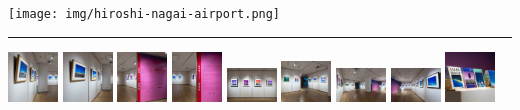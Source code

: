 \documentclass[
  letterpaper,
  DIV=11,
  numbers=noendperiod,
  oneside]{scrartcl}
\begin{document}
\texttt{[image: img/hiroshi-nagai-airport.png]}

\begin{center}\rule{0.5\linewidth}{0.5pt}\end{center}

\includegraphics[width=0.52083in,height=\textheight,keepaspectratio]{img/jpf/9.jpg}
\includegraphics[width=0.52083in,height=\textheight,keepaspectratio]{img/jpf/10.jpg}
\includegraphics[width=0.52083in,height=\textheight,keepaspectratio]{img/jpf/11.jpg}
\includegraphics[width=0.52083in,height=\textheight,keepaspectratio]{img/jpf/12.jpg}
\includegraphics[width=0.52083in,height=\textheight,keepaspectratio]{img/jpf/13.jpg}
\includegraphics[width=0.52083in,height=\textheight,keepaspectratio]{img/jpf/14.jpg}
\includegraphics[width=0.52083in,height=\textheight,keepaspectratio]{img/jpf/15.jpg}
\includegraphics[width=0.52083in,height=\textheight,keepaspectratio]{img/jpf/16.jpg}
\includegraphics[width=0.52083in,height=\textheight,keepaspectratio]{img/jpf/17.jpg}
\end{document}
